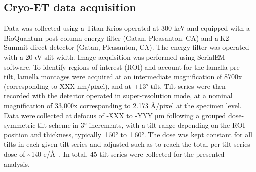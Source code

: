 \subsection{Cryo-ET data acquisition}\label{drad_tomo_method}
Data was collected using a Titan Krios operated at 300 keV and equipped with a BioQuantum post-column energy filter (Gatan, Pleasanton, CA) and a K2 Summit direct detector (Gatan, Pleasanton, CA).
The energy filter was operated with a 20 eV slit width.
Image acquisition was performed using SerialEM software.
To identify regions of interest (ROI) and account for the lamella pre-tilt, lamella montages were acquired at an intermediate magnification of 8700x (corresponding to XXX nm/pixel), and at +13° tilt.
Tilt series were then recorded with the detector operated in super-resolution mode, at a nominal magnification of 33,000x corresponding to 2.173 Å/pixel at the specimen level.
Data were collected at defocus of -XXX to -YYY μm following a grouped dose-symmetric tilt scheme in 3° increments, with a tilt range depending on the ROI position and thickness, typically ±50° to ±60°.
The dose was kept constant for all tilts in each given tilt series and adjusted such as to reach the total per tilt series dose of \sim140 e/Å~\cite{ericksonHowBacterialCell2017}.
In total, 45 tilt series were collected for the presented analysis.

